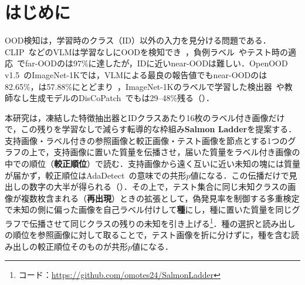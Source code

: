 \section{はじめに}
OOD検知は，学習時のクラス（ID）以外の入力を見分ける問題である．CLIP~\cite{radford2021clip}などのVLMは学習なしにOODを検知でき~\cite{ming2022mcm}，負例ラベル~\cite{jiang2024neglabel}やテスト時の適応~\cite{zhang2024adaneg,zhang2026tanl,xu2026interneg,yang2026tins}でfar-OODの\AUC{}は97\%に達したが，IDに近いnear-OODは難しい．OpenOOD v1.5~\cite{zhang2023openood}のImageNet-1Kでは，VLMによる最良の報告値でもnear-OODの\AUC{}は82.65\%，\FPR{}は57.88\%にとどまり~\cite{yang2026tins}，ImageNet-1Kのラベルで学習した検出器~\cite{park2023nnguide,li2024moodv2}や教師なし生成モデルのDisCoPatch~\cite{caetano2025discopatch}でも\FPR{}は29--48\%残る（）．

本研究は，凍結した特徴抽出器とIDクラスあたり16枚のラベル付き画像だけで，この残りを学習なしで減らす転導的な枠組み\textbf{Salmon Ladder}を提案する．支持画像・ラベル付きの参照画像と較正画像・テスト画像を節点とする1つのグラフの上で，支持画像に置いた質量を伝播させ，届いた質量をラベル付き画像の中での順位（\textbf{較正順位}）で読む．支持画像から遠く互いに近い未知の塊には質量が届かず，較正順位はAdaDetect~\cite{marandon2024adadetect}の意味での共形$p$値になる．この伝播だけで見出しの数字の大半が得られる（）．その上で，テスト集合に同じ未知クラスの画像が複数枚含まれる（\textbf{再出現}）ときの拡張として，偽発見率を制御する多重検定で未知の側に偏った画像を自己ラベル付けして\textbf{種}にし，種に置いた質量を同じグラフで伝播させて同じクラスの残りの未知を引き上げる\footnote{コード：\url{https://github.com/omotes24/SalmonLadder}}．種の選択と読み出しの順位を参照画像に対して取ることで，テスト画像を折に分けずに，種を含む読み出しの較正順位そのものが共形$p$値になる．

